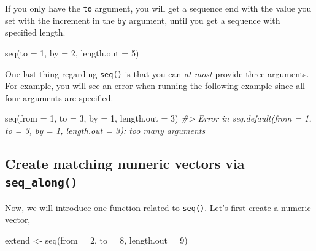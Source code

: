 \documentclass[
]{book}
\newenvironment{Shaded}{\begin{snugshade}}{\end{snugshade}}
\newcommand{\AttributeTok}[1]{\textcolor[rgb]{0.77,0.63,0.00}{#1}}
\newcommand{\CommentTok}[1]{\textcolor[rgb]{0.56,0.35,0.01}{\textit{#1}}}
\newcommand{\DecValTok}[1]{\textcolor[rgb]{0.00,0.00,0.81}{#1}}
\newcommand{\FunctionTok}[1]{\textcolor[rgb]{0.00,0.00,0.00}{#1}}
\newcommand{\NormalTok}[1]{#1}
\newcommand{\OtherTok}[1]{\textcolor[rgb]{0.56,0.35,0.01}{#1}}
\begin{document}
If you only have the \texttt{to} argument, you will get a sequence end with the value you set with the increment in the \texttt{by} argument, until you get a sequence with specified length.

\begin{Shaded}
\begin{Highlighting}[]
\FunctionTok{seq}\NormalTok{(}\AttributeTok{to =} \DecValTok{1}\NormalTok{, }\AttributeTok{by =} \DecValTok{2}\NormalTok{, }\AttributeTok{length.out =} \DecValTok{5}\NormalTok{)}
\end{Highlighting}
\end{Shaded}

One last thing regarding \texttt{seq()} is that you can \emph{at most} provide three arguments. For example, you will see an error when running the following example since all four arguments are specified.

\begin{Shaded}
\begin{Highlighting}[]
\FunctionTok{seq}\NormalTok{(}\AttributeTok{from =} \DecValTok{1}\NormalTok{, }\AttributeTok{to =} \DecValTok{3}\NormalTok{, }\AttributeTok{by =} \DecValTok{1}\NormalTok{, }\AttributeTok{length.out =} \DecValTok{3}\NormalTok{)}
\CommentTok{\#\textgreater{} Error in seq.default(from = 1, to = 3, by = 1, length.out = 3): too many arguments}
\end{Highlighting}
\end{Shaded}

\hypertarget{create-matching-numeric-vectors-via-seq_along}{%
\subsection{\texorpdfstring{Create matching numeric vectors via \texttt{seq\_along()}}{Create matching numeric vectors via seq\_along()}}\label{create-matching-numeric-vectors-via-seq_along}}

Now, we will introduce one function related to \texttt{seq()}. Let's first create a numeric vector,

\begin{Shaded}
\begin{Highlighting}[]
\NormalTok{extend }\OtherTok{\textless{}{-}} \FunctionTok{seq}\NormalTok{(}\AttributeTok{from =} \DecValTok{2}\NormalTok{, }\AttributeTok{to =} \DecValTok{8}\NormalTok{, }\AttributeTok{length.out =} \DecValTok{9}\NormalTok{) }
\end{Highlighting}
\end{Shaded}
\end{document}
